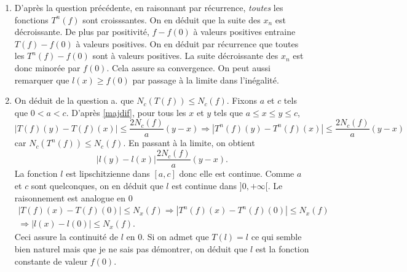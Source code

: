 \begin{enumerate}
\begin{enumerate}
 \item D'après la question précédente, en raisonnant par récurrence, \emph{toutes} les fonctions $T^n(f)$ sont croisssantes. On en déduit que la suite des $x_n$ est décroissante. De plus par positivité, $f -f(0)$ à valeurs positives entraine $T(f)-f(0)$ à valeurs positives. On en déduit par récurrence que toutes les $T^n(f)-f(0)$ sont à valeurs positives. La suite décroissante des $x_n$ est donc minorée par $f(0)$. Cela assure sa convergence. On peut aussi remarquer que $l(x)\geq f(0)$ par passage à la limite dans l'inégalité. 
 
 \item On déduit de la question a. que $N_c(T(f))\leq N_c(f)$. Fixons $a$ et $c$ tels que $0<a<c$. D'après \ref{majdif}, pour tous les $x$ et $y$ tels que $a\leq x \leq y \leq c$, 
\begin{displaymath}
 \left|T(f)(y) - T(f)(x)\right|\leq \frac{2 N_c(f)}{a}(y-x) 
\Rightarrow 
\left|T^n(f)(y) - T^n(f)(x)\right|\leq \frac{2 N_c(f)}{a}(y-x)
\end{displaymath}
car $N_c(T^n(f))\leq N_c(f)$. En passant à la limite, on obtient
\begin{displaymath}
 \left|l(y) - l(x)\right| \frac{2 N_c(f)}{a}(y-x).
\end{displaymath}
La fonction $l$ est lipschitzienne dans $[a,c]$ donc elle est continue. Comme $a$ et $c$ sont quelconques, on en déduit que $l$ est continue dans $]0,+\infty[$.\newline
Le raisonnement est analogue en $0$
\begin{multline*}
 \left|T(f)(x) - T(f)(0)\right| \leq N_x(f) 
\Rightarrow \left|T^n(f)(x) - T^n(f)(0)\right| \leq N_x(f)\\
\Rightarrow  \left|l(x) - l(0)\right| \leq N_x(f).
\end{multline*}
Ceci assure la continuité de $l$ en $0$. 
Si on admet que $T(l) = l$ ce qui semble bien naturel mais que je ne sais pas démontrer, on déduit que $l$ est la fonction constante de valeur $f(0)$.
\end{enumerate}
\end{enumerate}
